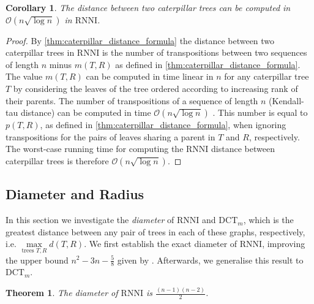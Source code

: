 \documentclass[11pt]{amsart}
\newtheorem{theorem}{Theorem}
\newtheorem{corollary}{Corollary}
\newcommand{\rnni}{\mathrm{RNNI}}
\newcommand{\dct}{\mathrm{DCT}}
\renewcommand{\O}{\mathcal O}
\newcommand{\summary}[1]{} %
\begin{document}
\begin{corollary}
	The distance between two caterpillar trees can be computed in $\O(n \sqrt{\log n})$ in $\rnni$.
	\label{cor:caterpillar_distance_rnni_nlogn}
\end{corollary}
\vspace{-0.66cm}

\begin{proof}
	By \autoref{thm:caterpillar_distance_formula} the distance between two caterpillar trees in $\rnni$ is the number of transpositions between two sequences of length $n$ minus $m(T,R)$ as defined in \autoref{thm:caterpillar_distance_formula}.
	The value $m(T,R)$ can be computed in time linear in $n$ for any caterpillar tree $T$ by considering the leaves of the tree ordered according to increasing rank of their parents.
	The number of transpositions of a sequence of length $n$ (Kendall-tau distance) can be computed in time $\O(n \sqrt{\log n})$ \autocite{Chan2010-ls}.
	This number is equal to $p(T,R)$, as defined in \autoref{thm:caterpillar_distance_formula}, when ignoring transpositions for the pairs of leaves sharing a parent in $T$ and $R$, respectively.
	The worst-case running time for computing the $\rnni$ distance between caterpillar trees is therefore $\O(n \sqrt{\log n})$.
\end{proof}

\subsection{Diameter and Radius}

\label{section:diameter}
\summary{Definition of Diameter.}
In this section we  investigate the \emph{diameter} of $\rnni$ and $\dct_m$, which is the greatest distance between any pair of trees in each of these graphs, respectively, i.e. $\max\limits_{\text{trees }T,R}d(T,R)$.
We first establish the exact diameter of $\rnni$, improving the upper bound $n^2 - 3n - \frac{5}{8}$ given by \textcite{Gavryushkin2018-ol}.
Afterwards, we generalise this result to $\dct_m$.

\begin{theorem}
	The diameter of $\rnni$ is $\frac{(n-1)(n-2)}{2}$.
	\label{thm:diameter_rnni}
\end{theorem}
\end{document}

